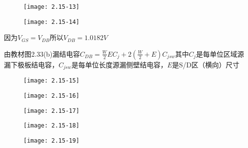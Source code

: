 \begin{figure}[H] %
	\begin{minipage}{\linewidth}
		\texttt{[image: 2.15-13]}
	\end{minipage}
\end{figure}


\begin{figure}[H] %
	\begin{minipage}{\linewidth}
		\texttt{[image: 2.15-14]}
	\end{minipage}
\end{figure}

因为$V_{GS}=V_{DB}$所以$V_{DB}=1.0182V$

由教材图2.33(b)漏结电容$C_{DB}=\frac{W}{2}EC_j+2(\frac{W}{2}+E)C_{jsw}$其中$C_j$是每单位区域源漏下极板结电容，$C_{jsw}$是每单位长度源漏侧壁结电容，$E$是S/D区（横向）尺寸

\begin{figure}[H] %
	\begin{minipage}{\linewidth}
		\texttt{[image: 2.15-15]}
	\end{minipage}
\end{figure}

\begin{figure}[H] %
	\begin{minipage}{\linewidth}
		\texttt{[image: 2.15-16]}
	\end{minipage}
\end{figure}


\begin{figure}[H] %
	\begin{minipage}{\linewidth}
		\texttt{[image: 2.15-17]}
	\end{minipage}
\end{figure}


\begin{figure}[H] %
	\begin{minipage}{\linewidth}
		\texttt{[image: 2.15-18]}
	\end{minipage}
\end{figure}

\begin{figure}[H] %
	\begin{minipage}{\linewidth}
		\texttt{[image: 2.15-19]}
	\end{minipage}
\end{figure}

